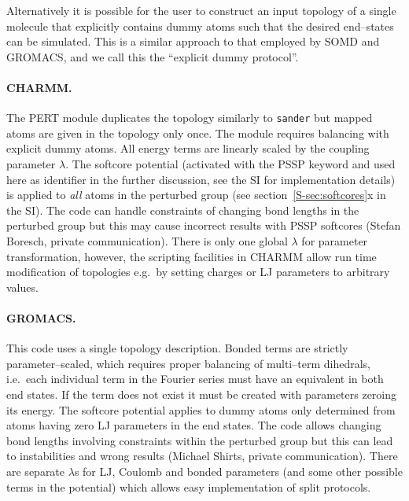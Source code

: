 \documentclass[journal=jctcce,manuscript=article]{achemso}
\newcommand{\progname}[1]{\texttt{#1}}
\begin{document}
Alternatively it is possible for the user to construct an input
topology of a single molecule that explicitly contains dummy atoms
such that the desired end--states can be simulated.  This is a similar approach to that employed by SOMD and GROMACS, and we call this the ``explicit dummy protocol''.

\paragraph{CHARMM.} The PERT module duplicates the topology similarly to
\progname{sander} but mapped atoms are given in the topology only once.
The module requires balancing with explicit dummy atoms.  All energy
terms are linearly scaled by the coupling parameter $\lambda$.  The softcore
potential (activated with the PSSP keyword and used here as identifier
in the further discussion, see the SI for implementation details) is
applied to \emph{all} atoms in the perturbed group (see
section~\ref{S-sec:softcores}x in the SI).  The code can handle
constraints of changing bond lengths in the perturbed group but this
may cause incorrect results with PSSP softcores (Stefan Boresch,
private communication).  There is only one global $\lambda$ for
parameter transformation, however, the scripting facilities in CHARMM
allow run time modification of topologies e.g.\ by setting charges or
LJ parameters to arbitrary values.

\paragraph{GROMACS.} This code uses a single topology description.
Bonded terms are strictly parameter--scaled, which requires proper
balancing of multi--term dihedrals, i.e.\ each individual term in the Fourier
series must have an equivalent in both end states.  If the term does not exist
it must be created with parameters zeroing its energy.
The softcore potential applies to dummy
atoms only determined from atoms having zero LJ parameters in the end states.
The code allows changing bond lengths involving constraints within the perturbed group  but this can lead to instabilities and wrong results (Michael Shirts, private communication).  There are separate $\lambda$s for LJ,
Coulomb and bonded parameters (and some other possible terms in the potential) which allows easy implementation
of split protocols.
\end{document}
